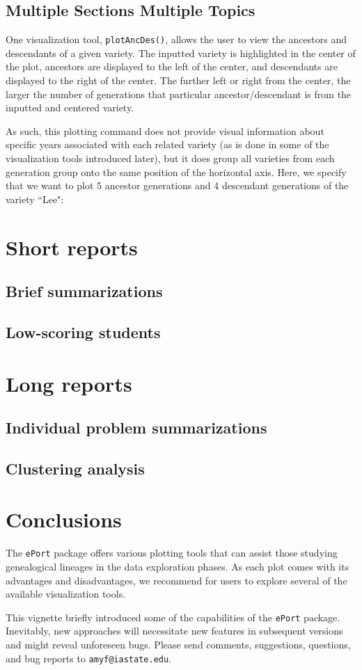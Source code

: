 \documentclass{article}\usepackage[]{graphicx}\usepackage[]{color}
\numberwithin{equation}{section} %
\newcommand{\pkg}[1]{{\texttt{#1}}}
\begin{document}
\subsection{Multiple Sections Multiple Topics}

One visualization tool, \texttt{plotAncDes()}, allows the user to view the ancestors and descendants of a given variety. The inputted variety is highlighted in the center of the plot, ancestors are displayed to the left of the center, and descendants are displayed to the right of the center. The further left or right from the center, the larger the number of generations that particular ancestor/descendant is from the inputted and centered variety.

As such, this plotting command does not provide visual information about specific years associated with each related variety (as is done in some of the visualization tools introduced later), but it does group all varieties from each generation group onto the same position of the horizontal axis. Here, we specify that we want to plot 5 ancestor generations and 4 descendant generations of the variety ``Lee":

\section{Short reports}

\subsection{Brief summarizations}
\subsection{Low-scoring students}

\section{Long reports}

\subsection{Individual problem summarizations}
\subsection{Clustering analysis}

\section{Conclusions}

The \pkg{ePort} package offers various plotting tools that can assist those studying genealogical lineages in the data exploration phases. As each plot comes with its advantages and disadvantages, we recommend for users to explore several of the available visualization tools.

This vignette briefly introduced some of the capabilities of the \pkg{ePort} package. Inevitably, new approaches will necessitate new features in subsequent versions and might reveal unforeseen bugs. Please send comments, suggestions, questions, and bug reports to \texttt{amyf@iastate.edu}.
\end{document}
